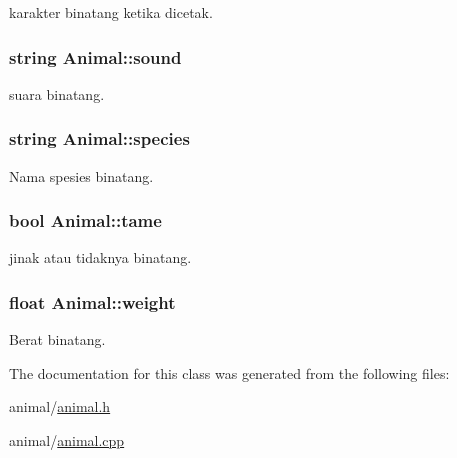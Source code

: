 karakter binatang ketika dicetak. 

\subsubsection[{\texorpdfstring{sound}{sound}}]{\setlength{\rightskip}{0pt plus 5cm}string Animal\+::sound\hspace{0.3cm}{\ttfamily [private]}}\hypertarget{classAnimal_ac800bcdcb21d51f0da161896ef28fd23}{}\label{classAnimal_ac800bcdcb21d51f0da161896ef28fd23}


suara binatang. 

\subsubsection[{\texorpdfstring{species}{species}}]{\setlength{\rightskip}{0pt plus 5cm}string Animal\+::species\hspace{0.3cm}{\ttfamily [private]}}\hypertarget{classAnimal_a70a223fc101b56962088b16a8b18534b}{}\label{classAnimal_a70a223fc101b56962088b16a8b18534b}


Nama spesies binatang. 

\subsubsection[{\texorpdfstring{tame}{tame}}]{\setlength{\rightskip}{0pt plus 5cm}bool Animal\+::tame\hspace{0.3cm}{\ttfamily [private]}}\hypertarget{classAnimal_a2f41d5123d973bd889ff9ee9d7ac6fd1}{}\label{classAnimal_a2f41d5123d973bd889ff9ee9d7ac6fd1}


jinak atau tidaknya binatang. 

\subsubsection[{\texorpdfstring{weight}{weight}}]{\setlength{\rightskip}{0pt plus 5cm}float Animal\+::weight\hspace{0.3cm}{\ttfamily [private]}}\hypertarget{classAnimal_a055c4df7dacb89eb4c2ca9bbee11ff24}{}\label{classAnimal_a055c4df7dacb89eb4c2ca9bbee11ff24}


Berat binatang. 



The documentation for this class was generated from the following files\+:\begin{DoxyCompactItemize}
\item 
animal/\hyperlink{animal_8h}{animal.\+h}\item 
animal/\hyperlink{animal_8cpp}{animal.\+cpp}\end{DoxyCompactItemize}
